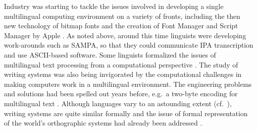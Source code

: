 Industry was starting to tackle the issues involved in developing a single
multilingual computing environment on a variety of fronts, including the then
new technology of bitmap fonts and the creation of Font Manager and Script
Manager by Apple \citep{Apple1985,Apple1986,Apple1988}. As noted above, around
this time linguists were developing work-arounds such as SAMPA, so that they
could communicate IPA transcription and use ASCII-based software. Some linguists
formalized the issues of multilingual text processing from a computational
perspective \citep{Anderson1984,Becker1984,Simons1989}. The study of writing
systems was also being invigorated \citep[11--15]{Sampson1985} by the
computational challenges in making computers work in a multilingual environment.
The engineering problems and solutions had been spelled out years before, e.g.\
a two-byte encoding for multilingual text \citep{Anderson1984}. Although
languages vary to an astounding extent (cf.\ \cite{EvansLevinson2009}), writing
systems are quite similar formally and the issue of formal representation of the
world's orthographic systems had already been addressed \citep{Simons1989}. 




